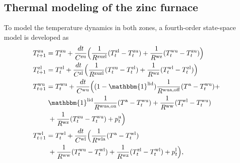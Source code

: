 \documentclass[conference]{IEEEtran}
\begin{document}
\subsection{Thermal modeling of the zinc furnace}
\vspace{-1mm}
To model the temperature dynamics in both zones, a fourth-order state-space model is developed as
%
\begingroup
\allowdisplaybreaks
\begin{subequations}\label{eq:StateSpaceModel}
    \begin{align}
        T^{\text{zu}}_{t+1} & = T^{\text{zu}}_{t} +   \frac{dt}{C^{\text{zu}}}\Bigl( \frac{1}{R^{\text{zuzl}}} (T^{\text{zl}}_{t} - T^{\text{zu}}_{t}) + \frac{1}{R^{\text{wz}}} (T^{\text{wu}}_{t} - T^{\text{zu}}_{t}) \Bigr) \label{eq1:StateSpaceModel} \\
        T^{\text{zl}}_{t+1} & = T^{\text{zl}}_{t} +   \frac{dt}{C^{\text{zl}}}\Bigl( \frac{1}{R^{\text{zuzl}}} (T^{\text{zu}}_{t} - T^{\text{zl}}_{t})  + \frac{1}{R^{\text{wz}}} (T^{\text{wl}}_{t} - T^{\text{zl}}_{t}) \Bigr) \label{eq2:StateSpaceModel} \\
        T^{\text{wu}}_{t+1} & = T^{\text{wu}}_{t} +   \frac{dt}{C^{\text{wu}}}\Bigl( (1-\mathbbm{1}^{\text{lid}}) \frac{1}{R^{\text{wua},\text{off}}} (T^{\text{a}} - T^{\text{wu}}_{t}) \notag + \\ & \mspace{5mu} \mathbbm{1}^{\text{lid}} \frac{1}{R^{\text{wua},\text{on}}} (T^{\text{a}} - T^{\text{wu}}_{t}) + \frac{1}{R^{\text{ww}}} (T^{\text{wl}}_{t} - T^{\text{wu}}_{t}) \notag \\ & \mspace{5mu} + \frac{1}{R^{\text{wz}}} (T^{\text{zu}}_{t} - T^{\text{wu}}_{t}) + p^{\text{u}}_{t} \Bigr) \label{eq3:StateSpaceModel} \\
        T^{\text{wl}}_{t+1} & = T^{\text{wl}}_{t} +   \frac{dt}{C^{\text{wl}}}\Bigl( \frac{1}{R^{\text{wla}}} (T^{\text{a}} - T^{\text{wl}}_{t}) \notag                                           \\ & \mspace{5mu} + \frac{1}{R^{\text{ww}}} (T^{\text{wu}}_{t} - T^{\text{wl}}_{t}) + \frac{1}{R^{\text{wz}}} (T^{\text{zl}}_{t} - T^{\text{wl}}_{t}) + p^{\text{l}}_{t} \Bigr), \label{eq4:StateSpaceModel}
    \end{align}
\end{subequations}
\endgroup
\end{document}
